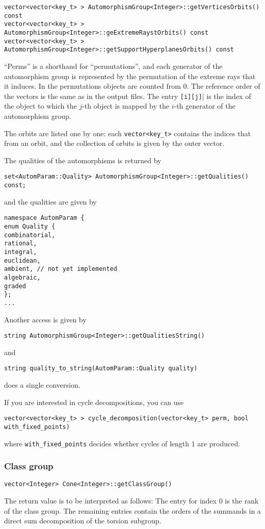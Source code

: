 \documentclass[12pt,a4paper]{scrartcl}
\theoremstyle{definition}
\begin{document}
\begin{small}
\begin{Verbatim}
vector<vector<key_t> > AutomorphismGroup<Integer>::getVerticesOrbits() const
vector<vector<key_t> > AutomorphismGroup<Integer>::geExtremeRaystOrbits() const
vector<vector<key_t> > AutomorphismGroup<Integer>::getSupportHyperplanesOrbits() const
\end{Verbatim}

``Perms'' is a shorthand for ``permutations'', and each generator of the automorphism group is represented by the permutation of the extreme rays that it induces. In the permutations objects are counted from $0$. The reference order of the vectors is the same as in the output files. The entry \verb|[i][j]|| is the index of the object to which the $j$-th object is mapped by the $i$-th generator of the automorphism group.

The orbits are listed one by one: each \verb|vector<key_t>| contains the indices that from an orbit, and the collection of orbits is given by the outer vector.

The qualities of the automorphisms is returned by
\begin{Verbatim}
set<AutomParam::Quality> AutomorphismGroup<Integer>::getQualities() const;
\end{Verbatim}
and the qualities are given by
\begin{Verbatim} 
namespace AutomParam {
enum Quality {
combinatorial,
rational,
integral,
euclidean,
ambient, // not yet implemented
algebraic,
graded
};
...
\end{Verbatim}
Another access is given by
\begin{Verbatim}
string AutomorphismGroup<Integer>::getQualitiesString()
\end{Verbatim}
and
\begin{Verbatim}
string quality_to_string(AutomParam::Quality quality)
\end{Verbatim}
does a single conversion.

If you are interested in cycle decompositions, you can use
\begin{Verbatim}
vector<vector<key_t> > cycle_decomposition(vector<key_t> perm, bool with_fixed_points)
\end{Verbatim}
where \verb|with_fixed_points| decides whether cycles of length $1$ are produced.

\subsubsection{Class group}

\begin{Verbatim}
vector<Integer> Cone<Integer>::getClassGroup()
\end{Verbatim}
The return value is to be interpreted as follows: The entry for index $0$ is the rank of the class group. The remaining entries contain the orders of the summands in a direct sum decomposition of the torsion subgroup.


\end{small}
\end{document}
